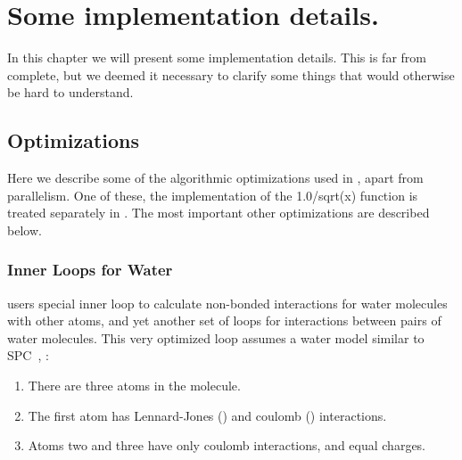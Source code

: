 %
% 
% 
% 
% 
% 
% 
% 
% 
%

\chapter{Some implementation details.}
In this chapter we will present some implementation details. This is
far from complete, but we deemed it necessary to clarify some things
that would otherwise be hard to understand.


\section{Optimizations}
Here we describe some of the algorithmic optimizations used 
in {\gromacs}, apart from parallelism. 
One of these, the implementation of the 
1.0/sqrt(x) function is treated separately in .
The most important other optimizations are described below.

\subsection{Inner Loops for Water}
{\gromacs} users special inner loop to calculate non-bonded
interactions for water molecules with other atoms, and yet
another set of loops for interactions between pairs of
water molecules. This very optimized loop assumes 
a water model similar to
SPC~\cite{Berendsen81}, {\ie}:
\begin{enumerate}
\item   There are three atoms in the molecule.
\item   The first atom has Lennard-Jones () and 
        coulomb () interactions.
\item   Atoms two and three have only coulomb interactions, 
        and equal charges.
\end{enumerate}

